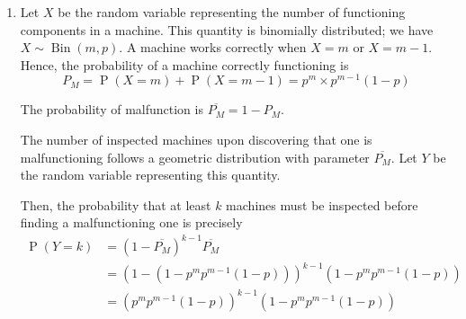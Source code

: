 \documentclass[11pt,letterpaper]{article}
\newcommand{\parens}[1]{\left(#1\right)}
\newcommand{\compl}[1]{\overline{#1}}
\DeclareMathOperator{\Prob}{P}
\renewcommand{\P}[1]{\Prob{\parens{#1}}}
\DeclareMathOperator{\BinOp}{Bin}
\newcommand{\Bin}[2]{\BinOp{\parens{#1,#2}}}
\begin{document}
\begin{enumerate}
    \item
        Let $X$ be the random variable representing the number of functioning
        components in a machine.
        This quantity is binomially distributed; we have $X \sim \Bin{m}{p}$.
        A machine works correctly when $X = m$ or $X = m-1$. Hence, the
        probability of a machine correctly functioning is
        \begin{equation*}
            P_M = \P{X = m} + \P{X = m-1} = p^m \times p^{m-1}(1-p)
        \end{equation*}

        The probability of malfunction is $\compl{P_M} = 1 - P_M$.

        The number of inspected machines upon discovering that one is
        malfunctioning follows a geometric distribution with parameter
        $\compl{P_M}$.
        Let $Y$ be the random variable representing this quantity.

        Then, the probability that at least $k$ machines must be inspected
        before finding a malfunctioning one is precisely
        \begin{align*}
            \P{Y = k}
            &= (1 - \compl{P_M})^{k-1} \compl{P_M} \\
            &= \parens{1 - (1 - p^m p^{m-1}(1-p))}^{k-1}
                (1 - p^m p^{m-1}(1-p)) \\
            &= \parens{p^m p^{m-1} (1-p)}^{k-1} (1 - p^m p^{m-1}(1-p))
        \end{align*}
\end{enumerate}
\end{document}
